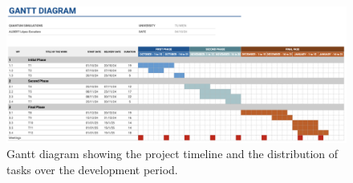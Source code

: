 \begin{figure}[H]
  \centering
  \includegraphics[width=1\textwidth]{img/Gantt_diagram.png}
  \caption{Gantt diagram showing the project timeline and the distribution of tasks over the development period.}
  \label{fig:gantt_diagram}
\end{figure}